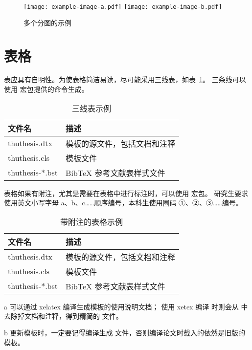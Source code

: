 \begin{figure}
  \centering
    {\texttt{[image: example-image-a.pdf]}}
    {\texttt{[image: example-image-b.pdf]}}
  \caption{多个分图的示例}
  \label{fig:multi-image}
\end{figure}



\section{表格}

表应具有自明性。为使表格简洁易读，尽可能采用三线表，如表~\ref{tab:three-line}。
三条线可以使用  宏包提供的命令生成。

\begin{table}
  \centering
  \caption{三线表示例}
  \begin{tabular}{ll}
    \toprule
    文件名          & 描述                         \\
    \midrule
    thuthesis.dtx   & 模板的源文件，包括文档和注释 \\
    thuthesis.cls   & 模板文件                     \\
    thuthesis-*.bst & BibTeX 参考文献表样式文件    \\
    \bottomrule
  \end{tabular}
  \label{tab:three-line}
\end{table}

表格如果有附注，尤其是需要在表格中进行标注时，可以使用  宏包。
研究生要求使用英文小写字母 a、b、c……顺序编号，本科生使用圈码 ①、②、③……编号。

\begin{table}
  \centering
  \begin{threeparttable}[c]
    \caption{带附注的表格示例}
    \label{tab:three-part-table}
    \begin{tabular}{ll}
      \toprule
      文件名                 & 描述                         \\
      \midrule
      thuthesis.dtx\tnote{a} & 模板的源文件，包括文档和注释 \\
      thuthesis.cls\tnote{b} & 模板文件                     \\
      thuthesis-*.bst        & BibTeX 参考文献表样式文件    \\
      \bottomrule
    \end{tabular}
    \begin{tablenotes}
      \item [a] 可以通过 xelatex 编译生成模板的使用说明文档；
        使用 xetex 编译  时则会从  中去除掉文档和注释，得到精简的  文件。
      \item [b] 更新模板时，一定要记得编译生成  文件，否则编译论文时载入的依然是旧版的模板。
    \end{tablenotes}
  \end{threeparttable}
\end{table}


